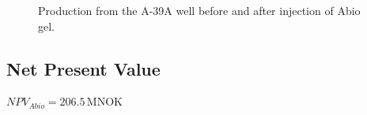 \documentclass[final]{beamer}
\begin{document}
\begin{frame}[t]
\begin{multicols}{3}
\begin{figure}[H]
  \centering
  
  \caption{Production from the A-39A well before and after injection of Abio gel.}
  \label{fig:abio_change}
\end{figure}

\subsection{Net Present Value}
\begin{center}
  $NPV_{Abio} = 206.5 \, \mathrm{MNOK}$
\end{center}




\end{multicols}

\end{frame}
\end{document}
